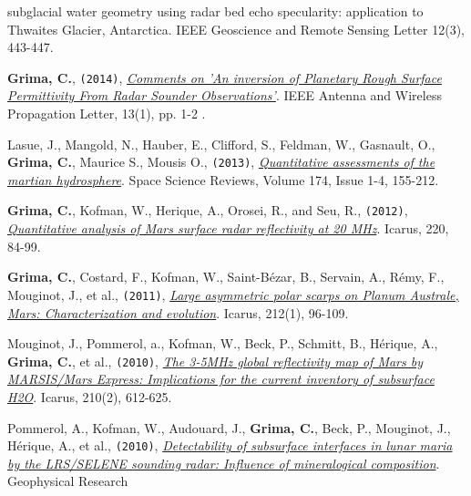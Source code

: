 \begin{etaremune}
{{  subglacial water geometry using radar bed echo specularity:
  application to Thwaites Glacier, Antarctica}.} IEEE Geoscience and
  Remote Sensing Letter 12(3), 443-447.
\item
  \textbf{Grima, C.}, \texttt{(2014)},
  \emph{\href{http://ieeexplore.ieee.org/xpl/articleDetails.jsp?tp=\&arnumber=6827185\&queryText\%3Dgrima}{Comments
  on 'An inversion of Planetary Rough Surface Permittivity From Radar
  Sounder Observations'}}. IEEE Antenna and Wireless Propagation Letter,
  13(1), pp. 1-2 .
\item
  Lasue, J., Mangold, N., Hauber, E., Clifford, S., Feldman, W.,
  Gasnault, O., \textbf{Grima, C.}, Maurice S., Mousis O.,
  \texttt{(2013)},
  \emph{\href{http://www.ig.utexas.edu/pubs/scripts/readpdf.php?contrib=2628}{Quantitative
  assessments of the martian hydrosphere}}. Space Science Reviews,
  Volume 174, Issue 1-4, 155-212.
\item
  \textbf{Grima, C.}, Kofman, W., Herique, A., Orosei, R., and Seu, R.,
  \texttt{(2012)},
  \href{http://www.sciencedirect.com/science/article/pii/S0019103512001558}{\emph{Quantitative
  analysis of Mars surface radar reflectivity at 20 MHz}}. Icarus, 220,
  84-99.
\item
  \textbf{Grima, C.}, Costard, F., Kofman, W., Saint-Bézar, B., Servain,
  A., Rémy, F., Mouginot, J., et al., \texttt{(2011)},
  \href{http://www.sciencedirect.com/science/article/pii/S0019103510004859}{\emph{Large
  asymmetric polar scarps on Planum Australe, Mars: Characterization and
  evolution}}. Icarus, 212(1), 96-109.
\item
  Mouginot, J., Pommerol, a., Kofman, W., Beck, P., Schmitt, B.,
  Hérique, A., \textbf{Grima, C.}, et al., \texttt{(2010)},
  \href{https://www.google.com/url?sa=t\&rct=j\&q=\&esrc=s\&source=web\&cd=1\&cad=rja\&ved=0CDAQFjAA\&url=http\%3A\%2F\%2Fess.uci.edu\%2Fresearchgrp\%2Ferignot\%2Ffiles\%2Fmouginot_icarus_2010.pdf\&ei=j6inUdytH5HA9QSNx4FQ\&usg=AFQjCNHiVV4-tjSgM28QWYY64vKaSa2U4Q\&sig2=fGYDJTm_cOpv0rwZIGDX6A\&bvm=bv.47244034,d.eWU}{
  \emph{The 3-5MHz global reflectivity map of Mars by MARSIS/Mars
  Express: Implications for the current inventory of subsurface H2O}}.
  Icarus, 210(2), 612-625.
\item
  Pommerol, A., Kofman, W., Audouard, J., \textbf{Grima, C.}, Beck, P.,
  Mouginot, J., Hérique, A., et al., \texttt{(2010)},
  \href{http://onlinelibrary.wiley.com/doi/10.1029/2009GL041681/abstract}{\emph{Detectability
  of subsurface interfaces in lunar maria by the LRS/SELENE sounding
  radar: Influence of mineralogical composition}}. Geophysical Research

\end{etaremune}
